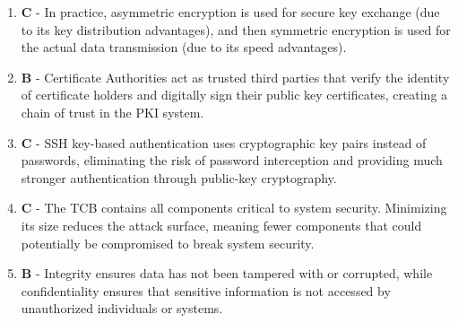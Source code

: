 \begin{enumerate}
    \item \textbf{C} - In practice, asymmetric encryption is used for secure key exchange (due to its key distribution advantages), and then symmetric encryption is used for the actual data transmission (due to its speed advantages).
    
    \item \textbf{B} - Certificate Authorities act as trusted third parties that verify the identity of certificate holders and digitally sign their public key certificates, creating a chain of trust in the PKI system.
    
    \item \textbf{C} - SSH key-based authentication uses cryptographic key pairs instead of passwords, eliminating the risk of password interception and providing much stronger authentication through public-key cryptography.
    
    \item \textbf{C} - The TCB contains all components critical to system security. Minimizing its size reduces the attack surface, meaning fewer components that could potentially be compromised to break system security.
    
    \item \textbf{B} - Integrity ensures data has not been tampered with or corrupted, while confidentiality ensures that sensitive information is not accessed by unauthorized individuals or systems.
\end{enumerate}
